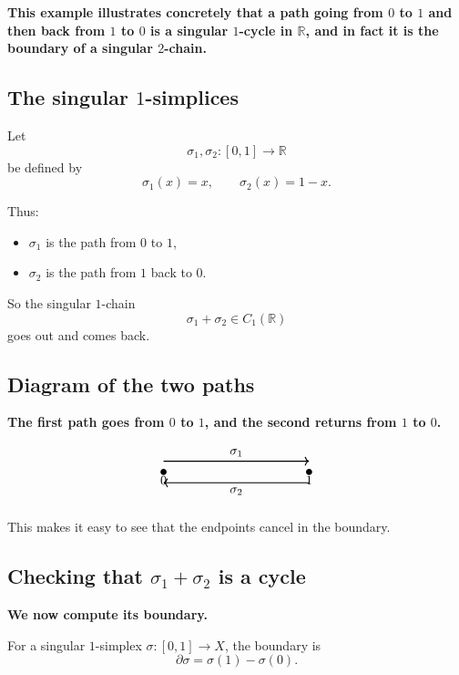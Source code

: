\documentclass[12pt,a4paper]{article}
\theoremstyle{notespace}
\begin{document}
\textbf{This example illustrates concretely that a path going from \(0\) to \(1\) and then back from \(1\) to \(0\) is a singular \(1\)-cycle in \(\mathbb{R}\), and in fact it is the boundary of a singular \(2\)-chain.}

\subsection{The singular \(1\)-simplices}

Let
\[
\sigma_1,\sigma_2:[0,1]\to \mathbb{R}
\]
be defined by
\[
\sigma_1(x)=x,
\qquad
\sigma_2(x)=1-x.
\]

Thus:

\begin{itemize}
	\item \(\sigma_1\) is the path from \(0\) to \(1\),
	\item \(\sigma_2\) is the path from \(1\) back to \(0\).
\end{itemize}

So the singular \(1\)-chain
\[
\sigma_1+\sigma_2\in C_1(\mathbb{R})
\]
goes out and comes back.

\subsection{Diagram of the two paths}

\textbf{The first path goes from \(0\) to \(1\), and the second returns from \(1\) to \(0\).}

\[
\begin{tikzpicture}[scale=2]
	\fill (0,0) circle (1.2pt) node[below] {\(0\)};
	\fill (2,0) circle (1.2pt) node[below] {\(1\)};
	
	\draw[->, thick] (0,0.15) -- (2,0.15) node[midway, above] {\(\sigma_1\)};
	\draw[<-, thick] (0,-0.15) -- (2,-0.15) node[midway, below] {\(\sigma_2\)};
\end{tikzpicture}
\]

This makes it easy to see that the endpoints cancel in the boundary.

\subsection{Checking that \(\sigma_1+\sigma_2\) is a cycle}

\textbf{We now compute its boundary.}

For a singular \(1\)-simplex \(\sigma:[0,1]\to X\), the boundary is
\[
\partial \sigma = \sigma(1)-\sigma(0).
\]
\end{document}
